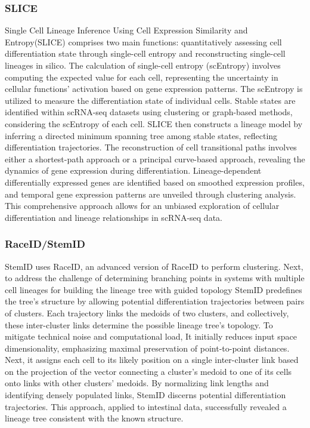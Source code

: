 \subsubsection{SLICE} 
Single Cell Lineage Inference Using Cell Expression Similarity and Entropy(SLICE)\citep{guo2017slice} comprises two main functions: quantitatively assessing cell differentiation state through single-cell entropy and reconstructing single-cell lineages in silico. The calculation of single-cell entropy (scEntropy) involves computing the expected value for each cell, representing the uncertainty in cellular functions' activation based on gene expression patterns. The scEntropy is utilized to measure the differentiation state of individual cells. Stable states are identified within scRNA-seq datasets using clustering or graph-based methods, considering the scEntropy of each cell. SLICE then constructs a lineage model by inferring a directed minimum spanning tree among stable states, reflecting differentiation trajectories. The reconstruction of cell transitional paths involves either a shortest-path approach or a principal curve-based approach, revealing the dynamics of gene expression during differentiation. Lineage-dependent differentially expressed genes are identified based on smoothed expression profiles, and temporal gene expression patterns are unveiled through clustering analysis. This comprehensive approach allows for an unbiased exploration of cellular differentiation and lineage relationships in scRNA-seq data.
\subsubsection{RaceID/StemID} 
StemID\citep{grun2016stemid} uses RaceID\citep{grun2015raceid}, an advanced version of RaceID to perform clustering. Next, to address the challenge of determining branching points in systems with multiple cell lineages for building the lineage tree with guided topology StemID predefines the tree's structure by allowing potential differentiation trajectories between pairs of clusters. Each trajectory links the medoids of two clusters, and collectively, these inter-cluster links determine the possible lineage tree's topology. To mitigate technical noise and computational load, It initially reduces input space dimensionality, emphasizing maximal preservation of point-to-point distances. Next, it assigns each cell to its likely position on a single inter-cluster link based on the projection of the vector connecting a cluster's medoid to one of its cells onto links with other clusters' medoids. By normalizing link lengths and identifying densely populated links, StemID discerns potential differentiation trajectories. This approach, applied to intestinal data, successfully revealed a lineage tree consistent with the known structure.
